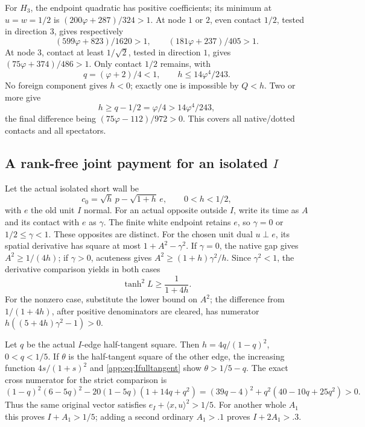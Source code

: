 \documentclass[11pt]{article}
\theoremstyle{definition}
\theoremstyle{remark}
\newcommand{\ip}[2]{\langle #1,#2\rangle}
\begin{document}
For \(H_3\), the endpoint quadratic has positive coefficients;
its minimum at \(u=w=1/2\) is
\((200\varphi+287)/324>1\).
At node \(1\) or \(2\), even contact \(1/2\), tested in
direction \(3\), gives respectively
\[
 (599\varphi+823)/1620>1,\qquad
 (181\varphi+237)/405>1.
\]
At node \(3\), contact at least \(1/\sqrt2\), tested in
direction \(1\), gives \((75\varphi+374)/486>1\).
Only contact \(1/2\) remains, with
\[
 q=(\varphi+2)/4<1,\qquad h\leq14\varphi^4/243.
\]
No foreign component gives \(h<0\); exactly one is impossible
by \(Q<h\). Two or more give
\[
 h\geq q-1/2=\varphi/4>14\varphi^4/243,
\]
the final difference being \((75\varphi-112)/972>0\).
This covers all native/dotted contacts and all spectators.

\subsection[A rank-free joint payment for an isolated I]{A rank-free joint payment for an isolated \(I\)}
\label{app:Ijoint}
Let the actual isolated short wall be
\[
 c_0=\sqrt h\,p-\sqrt{1+h}\,e,\qquad0<h<1/2,
\]
with \(e\) the old unit \(I\) normal.
For an actual opposite outside \(I\), write its time as \(A\)
and its contact with \(e\) as \(\gamma\).
The finite white endpoint retains \(e\), so \(\gamma=0\)
or \(1/2\leq\gamma<1\). These opposites are distinct.
For the chosen unit dual \(u\perp e\), its spatial derivative
has square at most \(1+A^2-\gamma^2\).
If \(\gamma=0\), the native gap gives \(A^2\geq1/(4h)\);
if \(\gamma>0\), acuteness gives
\(A^2\geq(1+h)\gamma^2/h\).
Since \(\gamma^2<1\), the derivative comparison yields in
both cases
\begin{equation}\label{app:eq:Ifulltangent}
 \tanh^2L\geq\frac1{1+4h}.
\end{equation}
For the nonzero case, substitute the lower bound on \(A^2\);
the difference from \(1/(1+4h)\), after positive denominators
are cleared, has numerator \(h((5+4h)\gamma^2-1)>0\).

Let \(q\) be the actual \(I\)-edge half-tangent square.
Then \(h=4q/(1-q)^2\), \(0<q<1/5\).
If \(\theta\) is the half-tangent square of the other edge,
the increasing function \(4s/(1+s)^2\) and
\eqref{app:eq:Ifulltangent} show \(\theta>1/5-q\).
The exact cross numerator for the strict comparison is
\[
 (1-q)^2(6-5q)^2-20(1-5q)(1+14q+q^2)
 =(39q-4)^2+q^2(40-10q+25q^2)>0.
\]
Thus the same original vector satisfies
\(e_I+\ip{x}{u}^2>1/5\).
For another whole \(A_1\) this proves \(I+A_1>1/5\);
adding a second ordinary \(A_1>.1\) proves \(I+2A_1>.3\).
\end{document}
